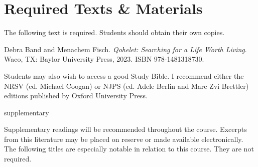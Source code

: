 \documentclass[titlepage]{article}
\newcommand\incl{../includes}
\begin{document}


%

\section{Required Texts \& Materials}
\label{texts}

The following text is required. Students should obtain their own copies.

\begingroup
\renewcommand{\section}[2]{}%
\begin{thebibliography}{Christianson}%

	 Debra Band and Menachem Fisch.
    \emph{Qohelet: Searching for a Life Worth Living}.
    Waco, TX: Baylor University Press, 2023.
	ISBN 978-1481318730.

\end{thebibliography}
\endgroup

Students may also wish to access a good Study Bible. I recommend either
the NRSV (ed. Michael Coogan) or NJPS (ed. Adele Berlin and Marc Zvi
Brettler) editions published by Oxford University Press.

\section{Supplementary Texts}
\label{supplementary}

Supplementary readings will be recommended throughout the course.
Excerpts from this literature may be placed on reserve or made available
electronically. The following titles are especially notable in relation
to this course. They are not required.
\end{document}
